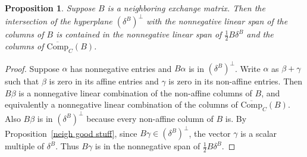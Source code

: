 \documentclass[10pt]{article}
\newtheorem{proposition}{Proposition}[section]
\theoremstyle{definition}
\theoremstyle{remark}
\numberwithin{equation}{section}
\newcommand{\0}{{\mathbf{0}}}
\newcommand{\CompPlus}{\overline{\mathrm{Comp}}_C}
\begin{document}
\begin{proposition}\label{Comp span}
Suppose $B$ is a neighboring exchange matrix.
Then the intersection of the hyperplane $(\delta^B)^\perp$ with the nonnegative linear span of the columns of $B$ is contained in the nonnegative linear span of $\frac12B\delta^B$ and the columns of $\CompPlus(B)$.
\end{proposition}
\begin{proof}
Suppose $\alpha$ has nonnegative entries and $B\alpha$ is in $(\delta^B)^\perp$.
Write $\alpha$ as $\beta+\gamma$ such that $\beta$ is zero in its affine entries and $\gamma$ is zero in its non-affine entries.
Then $B\beta$ is a nonnegative linear combination of the non-affine columns of $B$, and equivalently a nonnegative linear combination of the columns of $\CompPlus(B)$.
Also $B\beta$ is in $(\delta^B)^\perp$ because every non-affine column of $B$ is.
By Proposition~\ref{neigh good stuff}, since $B\gamma\in(\delta^B)^\perp$, the vector $\gamma$ is a scalar multiple of $\delta^B$.
Thus $B\gamma$ is in the nonnegative span of $\frac12B\delta^B$.
\end{proof}
\end{document}
